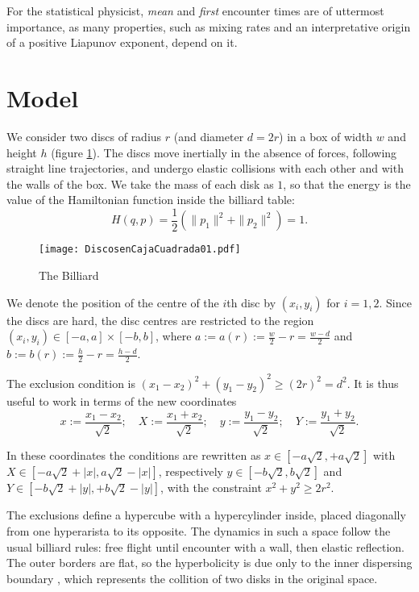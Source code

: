 \documentclass[a4paper,10pt, jcp, aps, preprint]{revtex4-1}
\newcommand{\defeq}{:=}
\begin{document}
For the statistical physicist, \emph{mean} and \emph{first} encounter
times are of uttermost importance, as many properties,
such as mixing rates and an interpretative origin of a positive
Liapunov exponent, depend on it. 



\section{Model}

We consider two discs of radius $r$ (and diameter $d=2r$) 
in a box of width $w$ and height $h$ (figure
\ref{billar01}). 
The discs move inertially in the absence of forces, 
following straight line trajectories,
and undergo elastic collisions with each 
other and with the walls of the box.
We take the mass of each disk as $1$, so that the energy
is the value of the Hamiltonian function inside the billiard table:
\begin{equation}
H(q,p)=\frac{1}{2}(\|p_1\|^2+\|p_2\|^2)=1.
\end{equation}

\begin{figure}[h]
  \centering
  \texttt{[image: DiscosenCajaCuadrada01.pdf]}
  \caption{The Billiard}\label{billar01}
\end{figure}

We denote the position of the centre of the $i$th disc by 
$(x_{i}, y_{i})$ for $i=1,2$. Since the discs are hard, 
the disc centres are restricted to the region 
$(x_i, y_i) \in [-a,a] \times [-b, b]$, where 
$a \defeq a(r) \defeq \frac{w}{2} - r = \frac{w-d}{2}$ and
 $b \defeq b(r) \defeq \frac{h}{2} - r = \frac{h-d}{2}$.


The exclusion condition is $(x_1-x_2)^2 + (y_1-y_2)^2 \ge (2r)^2 = d^2$.
It is thus useful to work in terms of the new coordinates
\begin{equation}\label{cambiocoor01}
 x \defeq \frac{x_1 - x_2}{\sqrt{2}}; 
\quad X \defeq \frac{x_1 + x_2}{\sqrt{2}}; 
\quad y \defeq \frac{y_1 - y_2}{\sqrt{2}}; 
\quad Y \defeq \frac{y_1 + y_2}{\sqrt{2}}.
\end{equation}


In these coordinates the conditions are rewritten as
$x \in [-a \sqrt{2}, +a \sqrt{2}]$ with 
$X \in [-a \sqrt{2} + |x|, a \sqrt{2} - |x|]$, respectively 
 $y \in [-b \sqrt{2}, b \sqrt{2}]$ and $Y \in [-b \sqrt{2} + |y|, +b \sqrt{2} - |y|]$,  
with the constraint $x^2 + y^2 \ge 2 r^2$.

The exclusions define a hypercube with a hypercylinder inside, placed diagonally 
from one hyperarista to its opposite. 
The dynamics in such a space follow
the usual billiard rules: free flight until
encounter with a wall, then elastic reflection.
The outer borders are flat, so the
hyperbolicity is due only to the inner dispersing
boundary \cite{Sim99}, which represents the collition of
two disks in the original space.
\end{document}
